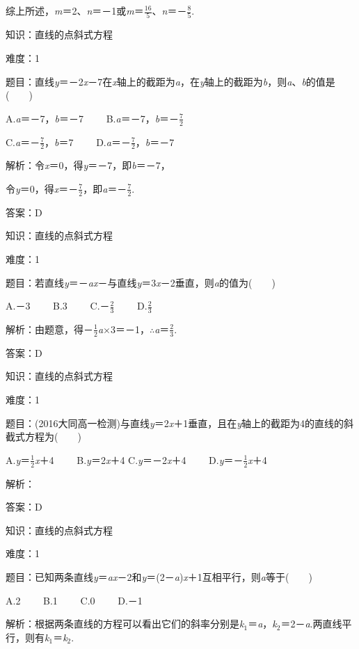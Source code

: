 \documentclass{article} %
\begin{document}
综上所述，\textit{m}＝2、\textit{n}＝－1或\textit{m}＝$\frac{16}{5}$、\textit{n}＝－$\frac{8}{5}$.


知识：直线的点斜式方程

难度：1

题目：直线\textit{y}＝－2\textit{x}－7在\textit{x}轴上的截距为\textit{a}，在\textit{y}轴上的截距为\textit{b}，则\textit{a}、\textit{b}的值是(　　)

A.\textit{a}＝－7，\textit{b}＝－7　　 B.\textit{a}＝－7，\textit{b}＝－$\frac{7}{2}$

C.\textit{a}＝－$\frac{7}{2}$，\textit{b}＝7　　  D.\textit{a}＝－$\frac{7}{2}$，\textit{b}＝－7

解析：令\textit{x}＝0，得\textit{y}＝－7，即\textit{b}＝－7，

令\textit{y}＝0，得\textit{x}＝－$\frac{7}{2}$，即\textit{a}＝－$\frac{7}{2}$.

答案：D

知识：直线的点斜式方程

难度：1

题目：若直线\textit{y}＝－\textit{ax}－与直线\textit{y}＝3\textit{x}－2垂直，则\textit{a}的值为(　　)

A.－3　　 B.3　　 C.－$\frac{2}{3}$　　 D.$\frac{2}{3}$

解析：由题意，得－$\frac{1}{2}$\textit{a}$\mathrm{\times}$3＝－1，$\mathrm{\therefore}$\textit{a}＝$\frac{2}{3}$.

答案：D

知识：直线的点斜式方程

难度：1

题目：(2016大同高一检测)与直线\textit{y}＝2\textit{x}＋1垂直，且在\textit{y}轴上的截距为4的直线的斜截式方程为(　　)

A.\textit{y}＝$\frac{1}{2}$\textit{x}＋4　　 B.\textit{y}＝2\textit{x}＋4 C.\textit{y}＝－2\textit{x}＋4　　 D.\textit{y}＝－$\frac{1}{2}$\textit{x}＋4

解析：

答案：D

知识：直线的点斜式方程

难度：1

题目：已知两条直线\textit{y}＝\textit{ax}－2和\textit{y}＝(2－\textit{a})\textit{x}＋1互相平行，则\textit{a}等于(　　)

A.2　　 B.1　　 C.0　　 D.－1

解析：根据两条直线的方程可以看出它们的斜率分别是\textit{k}${}_{1}$＝\textit{a}，\textit{k}${}_{2}$＝2－\textit{a}.两直线平行，则有\textit{k}${}_{1}$＝\textit{k}${}_{2}$.
\end{document}
